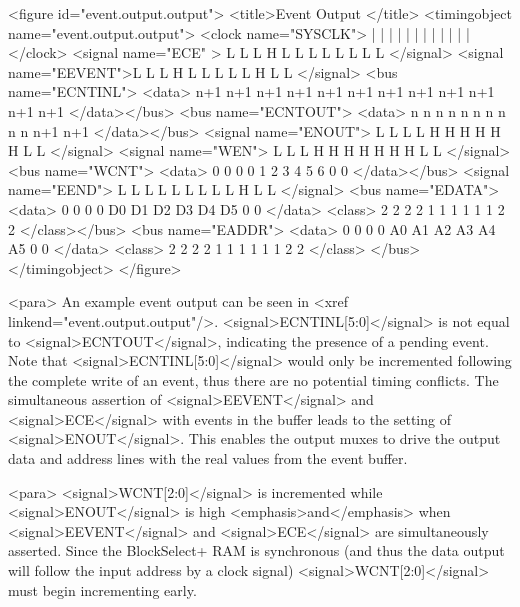         <figure id="event.output.output">
          <title>Event Output </title>
          <timingobject name="event.output.output">
            <clock name="SYSCLK"> |   |   |   |   |   |   |   |   |   |   |   | 
            </clock>
            <signal name="ECE"  > L   L   L   H   L   L   L   L   L   L   L   L
            </signal>
            <signal name="EEVENT">L   L   L   H   L   L   L   L   L   H   L   L
            </signal>
            <bus name="ECNTINL">
              <data>            n+1 n+1 n+1 n+1 n+1 n+1 n+1 n+1 n+1 n+1 n+1 n+1
            </data></bus>
            <bus name="ECNTOUT">
              <data>              n   n   n   n   n   n   n   n   n   n n+1 n+1
            </data></bus>
            <signal name="ENOUT"> L   L   L   L   H   H   H   H   H   H  L  L 
            </signal>
            <signal name="WEN">   L   L   L   H   H   H   H   H   H   H  L  L 
            </signal>
            <bus name="WCNT">
              <data>              0   0   0   0   1   2   3   4   5   6  0  0
            </data></bus>
            <signal name="EEND">  L   L   L   L   L   L   L   L   L   H  L  L
            </signal>    
            <bus name="EDATA">
              <data>              0   0   0   0   D0  D1  D2  D3  D4  D5 0  0 
              </data> 
              <class>             2   2   2   2   1    1  1   1   1   1  2  2
            </class></bus>
            <bus name="EADDR">
              <data>              0   0   0   0   A0  A1  A2  A3  A4  A5 0  0
              </data>
              <class>             2   2   2   2   1   1    1   1   1   1 2  2
              </class>
            </bus>
          </timingobject>
        </figure>
        
        <para> An example event output can be seen in <xref
        linkend="event.output.output"/>. <signal>ECNTINL[5:0]</signal>
        is not equal to <signal>ECNTOUT</signal>, indicating the
        presence of a pending event. Note that
        <signal>ECNTINL[5:0]</signal> would only be incremented
        following the complete write of an event, thus there are no
        potential timing conflicts. The simultaneous assertion of
        <signal>EEVENT</signal> and <signal>ECE</signal> with events
        in the buffer leads to the setting of
        <signal>ENOUT</signal>. This enables the output muxes to drive
        the output data and address lines with the real values from
        the event buffer. 

        <para> <signal>WCNT[2:0]</signal> is incremented while
        <signal>ENOUT</signal> is high <emphasis>and</emphasis> when
        <signal>EEVENT</signal> and <signal>ECE</signal> are
        simultaneously asserted. Since the BlockSelect+ RAM is
        synchronous (and thus the data output will follow the input
        address by a clock signal) <signal>WCNT[2:0]</signal> must
        begin incrementing early.

